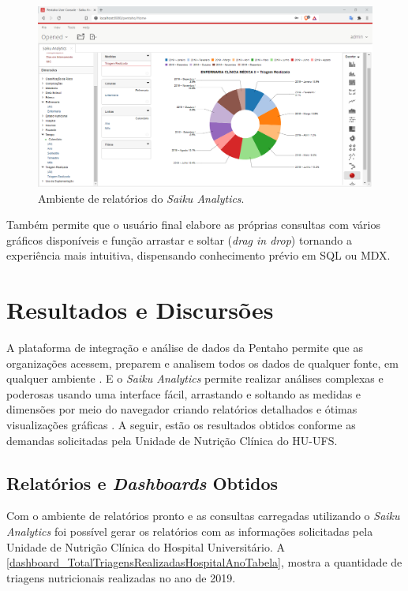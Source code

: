 \begin{figure}[htb]
	\caption{\label{fig_saikuanalytics}Ambiente de relatórios do \textit{Saiku Analytics}.}
	\begin{center}
	    \includegraphics[scale=0.45]{Imagens/figura - saikudashboard.png}
	\end{center}
\end{figure}

Também permite que o usuário final elabore as próprias consultas com vários gráficos disponíveis e função arrastar e soltar (\textit{drag in drop}) tornando a experiência mais intuitiva, dispensando conhecimento prévio em SQL ou MDX. 

\section{Resultados e Discursões}

A plataforma de integração e análise de dados da Pentaho permite que as organizações acessem, preparem e analisem todos os dados de qualquer fonte, em qualquer ambiente \cite{pentahosite}. E o \textit{Saiku Analytics} permite realizar análises complexas e poderosas usando uma interface fácil, arrastando e soltando as medidas e dimensões por meio do navegador criando relatórios detalhados e ótimas visualizações gráficas \cite{meteoribisite}. A seguir, estão  os resultados obtidos conforme as demandas solicitadas pela Unidade de Nutrição Clínica do HU-UFS.

\subsection{Relatórios e \textit{Dashboards} Obtidos}
Com o ambiente de relatórios pronto e as consultas carregadas utilizando o \textit{Saiku Analytics} foi possível gerar os relatórios com as informações solicitadas pela Unidade de Nutrição Clínica do Hospital Universitário. A \autoref{dashboard_TotalTriagensRealizadasHospitalAnoTabela}, mostra a quantidade de triagens nutricionais realizadas no ano de 2019.

